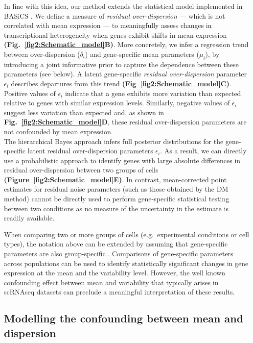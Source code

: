In line with this idea, our method extends the statistical model implemented in BASiCS \citep{Vallejos2015, Vallejos2016a}. We define a measure of \textit{residual over-dispersion} --- which is not correlated with mean expression --- to meaningfully assess changes in transcriptional heterogeneity when genes exhibit shifts in mean expression \textbf{(Fig.~\ref{fig2:Schematic_model}B)}. More concretely, we infer a regression trend between over-dispersion ($\delta_i$) and gene-specific mean parameters ($\mu_i$), by introducing a joint informative prior to capture the dependence between these parameters (see below). A latent gene-specific {\it residual over-dispersion} parameter $\epsilon_i$ describes departures from this trend \textbf{(Fig~\ref{fig2:Schematic_model}C)}. Positive values of $\epsilon_i$ indicate that a gene exhibits more variation than expected relative to genes with similar expression levels. Similarly, negative values of $\epsilon_i$ suggest less variation than expected and, as shown in \textbf{Fig.~\ref{fig2:Schematic_model}D}, these residual over-dispersion parameters are not confounded by mean expression. \\

The hierarchical Bayes approach infers full posterior distributions for the gene-specific latent residual over-dispersion parameters $\epsilon_i$. As a result, we can directly use a probabilistic approach to identify genes with large absolute differences in residual over-dispersion between two groups of cells \textbf{(Figure~\ref{fig2:Schematic_model}E)}. In contrast, mean-corrected point estimates for residual noise parameters (such as those obtained by the DM method) cannot be directly used to perform gene-specific statistical testing between two conditions as no measure of the uncertainty in the estimate is readily available.

When comparing two or more groups of cells (e.g.~experimental conditions or cell types), the notation above can be extended by assuming that gene-specific parameters are also group-specific \citep[as in][]{Vallejos2016a}. Comparisons of gene-specific parameters across populations can be used to identify statistically significant changes in gene expression at the mean and the variability level. However, the well known confounding effect between mean and variability that typically arises in scRNAseq datasets \citep{Brennecke2013} can preclude a meaningful interpretation of these results.  

\subsection{Modelling the confounding between mean and dispersion} \label{sec2:extended_BASiCS}

